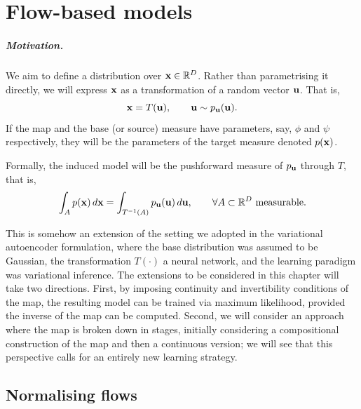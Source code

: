 \chapter{Flow-based models}



\paragraph{Motivation.}

We aim to define a distribution over ${ \mathbf{x}}\in{\mathbb R}^D$. Rather than parametrising it directly, we will express ${ \mathbf{x}}$ as a transformation of a random vector ${ \mathbf{u}}$. That is,
\[{ \mathbf{x}} = T({ \mathbf{u}}), \qquad { \mathbf{u}} \sim p_{ \mathbf{u}}({ \mathbf{u}}).\] If the map and the base (or source) measure have parameters, say, $\phi$ and $\psi$ respectively, they will be the parameters of the target measure denoted $p({ \mathbf{x}})$.

Formally, the induced model will be the pushforward measure of $p_{ \mathbf{u}}$ through $T$, that is,
\begin{equation}
    \label{eq:push_forward_density}
    \int_A p({ \mathbf{x}})\, d{ \mathbf{x}}
=
\int_{T^{-1}(A)} p_{ \mathbf{u}}({ \mathbf{u}})\, d{ \mathbf{u}} ,
\qquad
\forall A \subset \mathbb{R}^D \text{ measurable}.    
\end{equation}


This is somehow an extension of the setting we adopted in the variational autoencoder formulation, where the base distribution was assumed to be Gaussian, the transformation $T(\cdot)$ a neural network, and the learning paradigm was variational inference. The extensions to be considered in this chapter will take two directions. First, by imposing continuity and invertibility conditions of the map, the resulting model can be trained via maximum likelihood, provided the inverse of the map can be computed. Second, we will consider an approach where the map is broken down in stages, initially considering a compositional construction of the map and then a continuous version; we will see that this perspective calls for an entirely new learning strategy. 


\section{Normalising flows}

